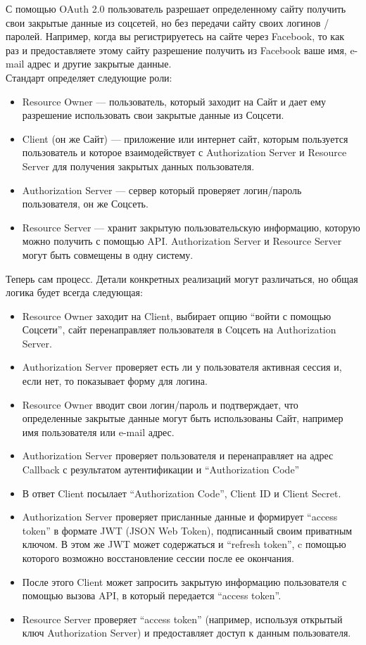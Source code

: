 С помощью OAuth 2.0 пользователь разрешает определенному сайту получить свои
закрытые данные из соцсетей, но без передачи сайту своих логинов / паролей. Например,
когда вы регистрируетесь на сайте через Facebook, то как раз и предоставляете этому сайту
разрешение получить из Facebook ваше имя, e-mail адрес и другие закрытые данные.~\\

Стандарт определяет следующие роли:

\begin{itemize}
    \item Resource Owner — пользователь, который заходит на Сайт и дает ему разрешение использовать свои закрытые данные из Соцсети.
    \item Client (он же Сайт) — приложение или интернет сайт, которым пользуется пользователь и которое взаимодействует с Authorization Server и Resource Server для получения закрытых данных пользователя.
    \item Authorization Server — сервер который проверяет логин/пароль пользователя, он же Соцсеть.
    \item Resource Server — хранит закрытую пользовательскую информацию, которую можно получить с помощью API. Authorization Server и Resource Server могут быть совмещены в одну систему.\autocite{OAuthRoles}
\end{itemize}

Теперь сам процесс. Детали конкретных реализаций могут различаться, но общая логика
будет всегда следующая:

\begin{itemize}
    \item Resource Owner заходит на Client, выбирает опцию “войти с помощью Соцсети”, сайт перенаправляет пользователя в Cоцсеть на Authorization Server.
    \item Authorization Server проверяет есть ли у пользователя активная сессия и, если нет, то показывает форму для логина.
    \item Resource Owner вводит свои логин/пароль и подтверждает, что определенные закрытые данные могут быть использованы Сайт, например имя пользователя или e-mail адрес.
    \item Authorization Server проверяет пользователя и перенаправляет на адрес Callback с результатом аутентификации и “Authorization Code”
    \item В ответ Client посылает “Authorization Code”, Client ID и Client Secret.
    \item Authorization Server проверяет присланные данные и формирует “access token” в формате JWT (JSON Web Token), подписанный своим приватным ключом. В этом же JWT может содержаться и “refresh token”, c помощью которого возможно восстановление сессии после ее окончания.
    \item После этого Client может запросить закрытую информацию пользователя с помощью вызова API, в который передается “access token”.
    \item Resource Server проверяет “access token” (например, используя открытый ключ Authorization Server) и предоставляет доступ к данным пользователя.\autocite{OAuthToken}
\end{itemize}

